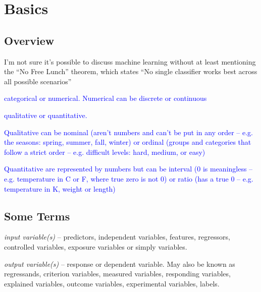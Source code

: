 \chapter{Basics}

\section{Overview}

I'm not sure it's possible to discuss machine learning without at least mentioning the ``No Free Lunch'' theorem, which states ``No single classifier works best across all possible scenarios''

\textcolor{blue}{categorical or numerical. Numerical can be discrete or continuous}

\textcolor{blue}{qualitative or quantitative.} 

\textcolor{blue}{Qualitative can be nominal (aren't numbers and can't be put in any order -- e.g. the seasons: spring, summer, fall, winter) or ordinal (groups and categories that follow a strict order -- e.g. difficult levels: hard, medium, or easy)}

\textcolor{blue}{Quantitative are represented by numbers but can be interval (0 is meaningless -- e.g. temperature in C or F, where true zero is not 0) or ratio (has a true 0 -- e.g. temperature in K, weight or length)}










\section{Some Terms}

\emph{input variable(s)} -- predictors, independent variables, features, regressors, controlled variables, exposure variables or simply variables.
 
\emph{output variable(s)} -- response or dependent variable. May also be known as regressands, criterion variables, measured variables, responding variables, explained variables, outcome variables, experimental variables, labels.

